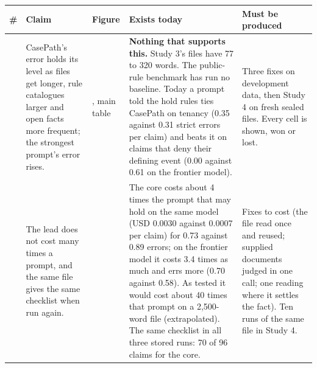 \documentclass[10pt]{article}
\newenvironment{claimpage}{}{}
\newcommand{\sect}[1]{\needspace{5\baselineskip}\vspace{3pt}{\bfseries #1\par}\vspace{1pt}}
\begin{document}
\begin{claimpage}
\sect{Question 2. Does CasePath beat the strongest prompt as cases get real?}
\begin{tabularx}{\linewidth}{>{\raggedright\arraybackslash}p{0.8em}>{\hsize=0.95\hsize\raggedright\arraybackslash}X>{\raggedright\arraybackslash}p{4.2em}>{\hsize=1.25\hsize\raggedright\arraybackslash}X>{\hsize=0.8\hsize\raggedright\arraybackslash}X}\toprule
\textbf{\#} & \textbf{Claim} & \textbf{Figure} & \textbf{Exists today} & \textbf{Must be produced}\\\midrule
4 & CasePath's error holds its level as files get longer, rule catalogues larger and open facts more frequent; the strongest prompt's error rises. & 5, main table & \textbf{Nothing that supports this.} Study 3's files have 77 to 320 words. The public-rule benchmark has run no baseline. Today a prompt told the hold rules ties CasePath on tenancy (0.35 against 0.31 strict errors per claim) and beats it on claims that deny their defining event (0.00 against 0.61 on the frontier model). & Three fixes on development data, then Study 4 on fresh sealed files. Every cell is shown, won or lost.\\
5 & The lead does not cost many times a prompt, and the same file gives the same checklist when run again. & 7 & The core costs about 4 times the prompt that may hold on the same model (USD 0.0030 against 0.0007 per claim) for 0.73 against 0.89 errors; on the frontier model it costs 3.4 times as much and errs more (0.70 against 0.58). As tested it would cost about 40 times that prompt on a 2,500-word file (extrapolated). The same checklist in all three stored runs: 70 of 96 claims for the core. & Fixes to cost (the file read once and reused; supplied documents judged in one call; one reading where it settles the fact). Ten runs of the same file in Study 4.\\
\bottomrule\end{tabularx}


\end{claimpage}
\end{document}
